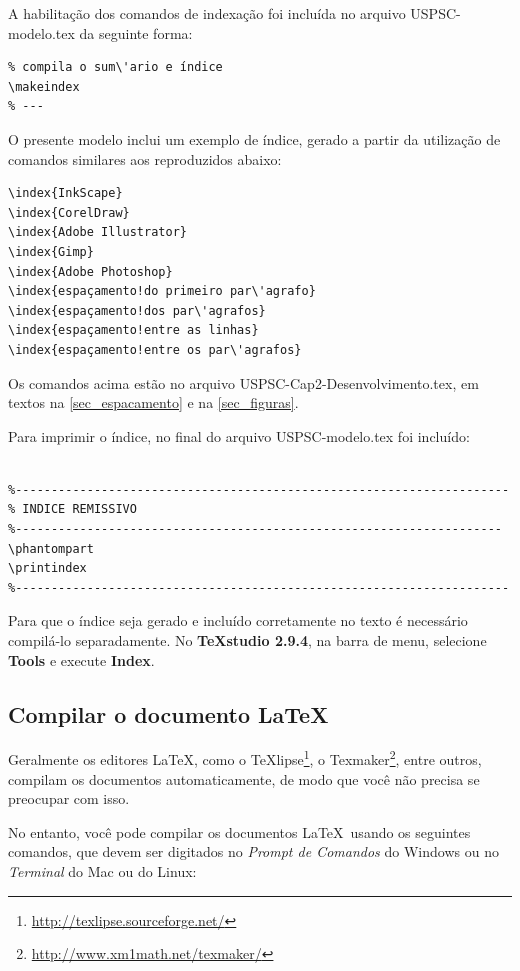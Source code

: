 A habilitação dos comandos de indexação foi incluída no arquivo USPSC-modelo.tex da seguinte forma:


\begin{verbatim}
% compila o sum\'ario e índice
\makeindex
% ---
\end{verbatim}

O presente modelo inclui um exemplo de índice, gerado a partir da utilização de comandos similares aos reproduzidos abaixo:

\begin{verbatim}
\index{InkScape}
\index{CorelDraw}
\index{Adobe Illustrator}
\index{Gimp}
\index{Adobe Photoshop}
\index{espaçamento!do primeiro par\'agrafo}
\index{espaçamento!dos par\'agrafos}
\index{espaçamento!entre as linhas}
\index{espaçamento!entre os par\'agrafos}
\end{verbatim}

Os comandos acima estão no arquivo USPSC-Cap2-Desenvolvimento.tex, em textos na  \autoref{sec_espacamento}  e na  \autoref{sec_figuras}.

Para imprimir o índice, no final do arquivo USPSC-modelo.tex foi incluído:

\begin{verbatim}

%---------------------------------------------------------------------
% INDICE REMISSIVO
%--------------------------------------------------------------------
\phantompart
\printindex
%---------------------------------------------------------------------
\end{verbatim}

Para que o índice seja gerado e incluído corretamente no texto \'e necess\'ario compil\'a-lo separadamente. No \textbf{TeXstudio 2.9.4}, na barra de menu, selecione \textbf{Tools} e execute \textbf{Index}.


\subsection{Compilar o documento \LaTeX}

Geralmente os editores \LaTeX, como o
TeXlipse\footnote{\url{http://texlipse.sourceforge.net/}}, o
Texmaker\footnote{\url{http://www.xm1math.net/texmaker/}}, entre outros,
compilam os documentos automaticamente, de modo que voc\^e não precisa se
preocupar com isso.

No entanto, voc\^e pode compilar os documentos \LaTeX\ usando os seguintes
comandos, que devem ser digitados no \emph{Prompt de Comandos} do Windows ou no
\emph{Terminal} do Mac ou do Linux:

